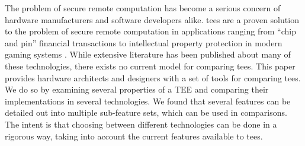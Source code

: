 The problem of secure remote computation has become a serious concern of hardware manufacturers and software developers alike. \glspl{tee} are a proven solution to the problem of secure remote computation in applications ranging from ``chip and pin'' financial transactions \cite{679731} to intellectual property protection in modern gaming systems \cite{da2018securing}. While extensive literature has been published about many of these technologies, there exists no current model for comparing \glspl{tee}. This paper provides hardware architects and designers with a set of tools for comparing \glspl{tee}. We do so by examining several properties of a TEE and comparing their implementations in several technologies. We found that several features can be detailed out into multiple sub-feature sets, which can be used in comparisons. The intent is that choosing between different technologies can be done in a rigorous way, taking into account the current features available to \glspl{tee}.